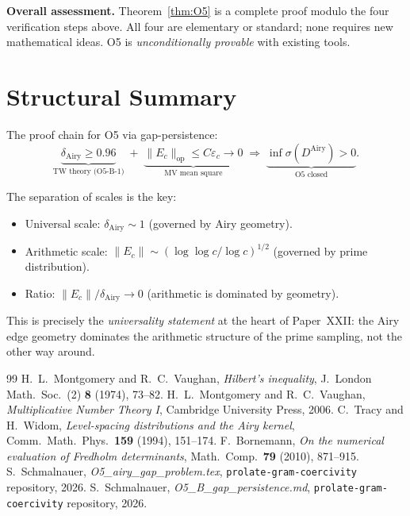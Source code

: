 \documentclass[12pt,a4paper]{amsart}
\theoremstyle{definition}
\newcommand{\DAi}{D^{\mathrm{Airy}}}
\newcommand{\norm}[1]{\|#1\|}
\newcommand{\Ec}{E_c}
\begin{document}
\textbf{Overall assessment.}
Theorem~\ref{thm:O5} is a complete proof modulo the four verification steps above.
All four are elementary or standard; none requires new mathematical ideas.
O5 is \emph{unconditionally provable} with existing tools.

\section{Structural Summary}
\label{sec:summary}

The proof chain for O5 via gap-persistence:
\begin{equation}
  \underbrace{\delta_{\mathrm{Airy}} \ge 0.96}_{\text{TW theory (O5-B-1)}}
  \;+\;
  \underbrace{\norm{\Ec}_{\mathrm{op}} \le C\varepsilon_c \to 0}_{\text{MV mean square}}
  \;\Longrightarrow\;
  \underbrace{\inf\sigma(\DAi) > 0}_{\text{O5 closed}}.
\end{equation}

The separation of scales is the key:
\begin{itemize}
  \item Universal scale: $\delta_{\mathrm{Airy}} \sim 1$ (governed by Airy geometry).
  \item Arithmetic scale: $\norm{\Ec} \sim (\log\log c/\log c)^{1/2}$ (governed by prime distribution).
  \item Ratio: $\norm{\Ec}/\delta_{\mathrm{Airy}} \to 0$ (arithmetic is dominated by geometry).
\end{itemize}

This is precisely the \emph{universality statement} at the heart of Paper~XXII:
the Airy edge geometry dominates the arithmetic structure of the prime sampling,
not the other way around.

\begin{thebibliography}{99}
H.~L.~Montgomery and R.~C.~Vaughan,
\textit{Hilbert's inequality},
J.\ London Math.\ Soc.\ (2) \textbf{8} (1974), 73--82.
H.~L.~Montgomery and R.~C.~Vaughan,
\textit{Multiplicative Number Theory I},
Cambridge University Press, 2006.
C.~Tracy and H.~Widom,
\textit{Level-spacing distributions and the Airy kernel},
Comm.\ Math.\ Phys.\ \textbf{159} (1994), 151--174.
F.~Bornemann,
\textit{On the numerical evaluation of Fredholm determinants},
Math.\ Comp.\ \textbf{79} (2010), 871--915.
S.~Schmalnauer,
\textit{O5\_airy\_gap\_problem.tex},
\texttt{prolate-gram-coercivity} repository, 2026.
S.~Schmalnauer,
\textit{O5\_B\_gap\_persistence.md},
\texttt{prolate-gram-coercivity} repository, 2026.
\end{thebibliography}
\end{document}
